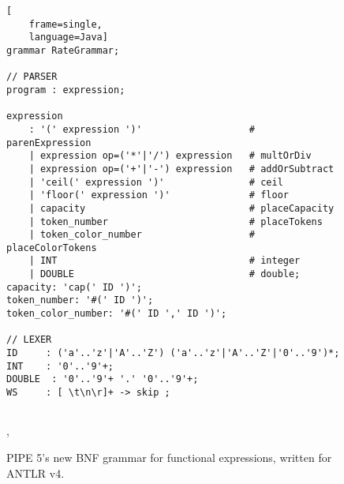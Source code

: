 \begin{figure}
\begin{lstlisting}[
    frame=single,
    language=Java]
grammar RateGrammar;

// PARSER
program : expression;

expression
    : '(' expression ')'                   # parenExpression
    | expression op=('*'|'/') expression   # multOrDiv
    | expression op=('+'|'-') expression   # addOrSubtract
    | 'ceil(' expression ')'               # ceil
    | 'floor(' expression ')'              # floor
    | capacity                             # placeCapacity
    | token_number                         # placeTokens
    | token_color_number                   # placeColorTokens
    | INT                                  # integer
    | DOUBLE                               # double;
capacity: 'cap(' ID ')';
token_number: '#(' ID ')';
token_color_number: '#(' ID ',' ID ')';

// LEXER
ID     : ('a'..'z'|'A'..'Z') ('a'..'z'|'A'..'Z'|'0'..'9')*;
INT    : '0'..'9'+;
DOUBLE  : '0'..'9'+ '.' '0'..'9'+;
WS     : [ \t\n\r]+ -> skip ;
    
\end{lstlisting}
\caption{PIPE 5's new BNF grammar for functional expressions, written for ANTLR v4.}

\label{lst:bnf},
\end{figure}
